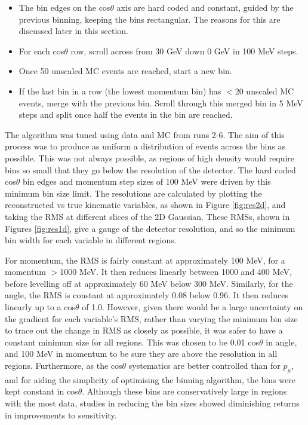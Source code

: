 \begin{itemize}

\item The bin edges on the cos$\theta$ axis are hard coded and constant, guided by the previous binning, keeping the bins rectangular. The reasons for this are discussed later in this section.

\item For each cos$\theta$ row, scroll across from 30 GeV down 0 GeV in 100 MeV steps.

\item Once 50 unscaled MC events are reached, start a new bin.

\item If the last bin in a row (the lowest momentum bin) has $<$20 unscaled MC events, merge with the previous bin. Scroll through this merged bin in 5 MeV steps and split once half the events in the bin are reached.

\end{itemize}

The algorithm was tuned using data and MC from runs 2-6. The aim of this process was to produce as uniform a distribution of events across the bins as possible. This was not always possible, as regions of high density would require bins so small that they go below the resolution of the detector. The hard coded cos$\theta$ bin edges and momentum step sizes of 100 MeV were driven by this minimum bin size limit. The resolutions are calculated by plotting the reconstructed vs true kinematic variables, as shown in Figure \ref{fig:res2d}, and taking the RMS at different slices of the 2D Gaussian. These RMSs, shown in Figures \ref{fig:res1d}, give a gauge of the detector resolution, and so the minimum bin width for each variable in different regions.

For momentum, the RMS is fairly constant at approximately 100 MeV, for a momentum $>$1000 MeV. It then reduces linearly between 1000 and 400 MeV, before levelling off at approximately 60 MeV below 300 MeV. Similarly, for the angle, the RMS is constant at approximately 0.08 below 0.96. It then reduces linearly up to a cos$\theta$ of 1.0. However, given there would be a large uncertainty on the gradient for each variable's RMS, rather than varying the minimum bin size to trace out the change in RMS as closely as possible, it was safer to have a constant minimum size for all regions. This was chosen to be 0.01 cos$\theta$ in angle, and 100 MeV in momentum to be sure they are above the resolution in all regions. Furthermore, as the cos$\theta$ systematics are better controlled than for $p_{\mu}$, and for aiding the simplicity of optimising the binning algorithm, the bins were kept constant in cos$\theta$. Although these bins are conservatively large in regions with the most data, studies in reducing the bin sizes showed diminishing returns in improvements to sensitivity.

